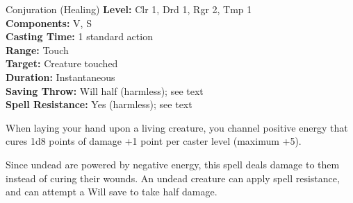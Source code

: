 {Conjuration (Healing)}
{
	\textbf{Level:}
	Clr 1, Drd 1, Rgr 2, Tmp 1\\
	\textbf{Components:}
	V, S\\
	\textbf{Casting Time:}
	1 standard action\\
	\textbf{Range:}
	Touch\\
	\textbf{Target:}
	Creature touched\\
	\textbf{Duration:}
	Instantaneous\\
	\textbf{Saving Throw:}
	Will half (harmless); see text\\
	\textbf{Spell Resistance:}
	Yes (harmless); see text\\
}
{
	When laying your hand upon a living creature, you channel positive energy that cures 1d8 points of damage +1 point per caster level (maximum +5).

	Since undead are powered by negative energy, this spell deals damage to them instead of curing their wounds. An undead creature can apply spell resistance, and can attempt a Will save to take half damage.

}
